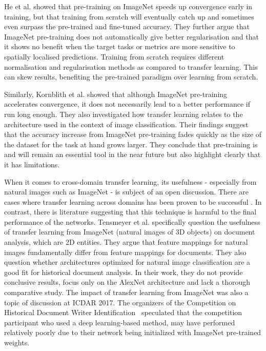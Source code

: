 \documentclass[journal]{IEEEtran}
\newcommand{\vp}[1]{{\color{black}#1}}
\begin{document}
He et al. \cite{he2018rethinking} showed that pre-training on ImageNet speeds up convergence early in training, but that training from scratch will eventually catch up and sometimes even surpass the pre-trained and fine-tuned accuracy.
They further argue that ImageNet pre-training does not automatically give better regularisation and that it shows no benefit when the target tasks or metrics are more sensitive to spatially localised predictions. 
Training from scratch requires different normalisation and regularisation methods as compared to transfer learning.
This can skew results, benefiting the pre-trained paradigm over learning from scratch. 

Similarly, Kornblith et al. \cite{kornblith2018better} showed that although ImageNet pre-training accelerates convergence, it does not necessarily lead to a better performance if run long enough. 
They also investigated how transfer learning relates to the architecture used in the context of image classification.
Their findings suggest that the accuracy increase from ImageNet pre-training fades quickly as the size of the dataset for the task at hand grows larger.  
They conclude that pre-training is and will remain an essential tool in the near future but also highlight clearly that it has limitations. 

When it comes to cross-domain transfer learning, its usefulness - especially from natural images such as ImageNet - is subject of an open discussion.
There are cases where transfer learning across domains has been proven to be successful \cite{singh2017transforming, pondenkandath2018watermarks}.
In contrast, there is literature suggesting that this technique is harmful to the final performance of the networks.
Tensmeyer et al. \cite{tensmeyer2017convolutional} specifically question the usefulness of transfer learning from ImageNet (natural images of 3D objects) on document analysis, which are 2D entities. 
They argue that feature mappings for natural images fundamentally differ from feature mappings for documents.
They also question whether architectures optimized for natural image classification are a good fit for historical document analysis.
In their work, they do not provide conclusive results, focus only on the AlexNet \cite{krizhevsky2012imagenet} architecture and lack a thorough comparative study.
\vp{The impact of transfer learning from ImageNet was also a topic of discussion at \ac{ICDAR} 2017. The organizers of the Competition on Historical Document Writer Identification~\cite{fiel2017icdar2017} speculated that the competition participant who used a deep learning-based method, may have performed relatively poorly due to their network being initialized with ImageNet pre-trained weights.}
\end{document}
